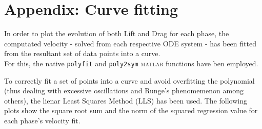 \section*{Appendix: Curve fitting}
In order to plot the evolution of both Lift and Drag for each phase, the computated velocity - solved from each respective ODE system - has been fitted from the resultant set of data points into a curve.\\
For this, the native \texttt{polyfit} and \texttt{poly2sym} \textsc{matlab} functions have ben employed. 

To correctly fit a set of points into a curve and avoid overfitting the polynomial (thus dealing with excessive oscillations and Runge's phenomemenon among others), the lienar Least Squares Method (LLS) has been used. The following plots show the square root sum and the norm of the squared regression value for each phase's velocity fit.